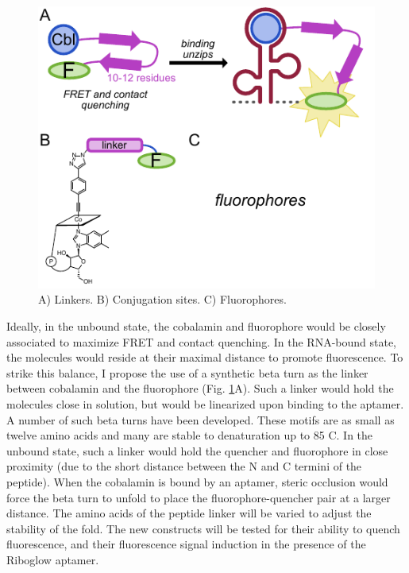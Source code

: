 \begin{figure}
\begin{centering}
\includegraphics[width=\textwidth]{figures/aim1v2.pdf}

\end{centering}
\footnotesize
\caption{\label{figure:aim1}
A) Linkers. B) Conjugation sites. C) Fluorophores.
}
\end{figure}

Ideally, in the unbound state, the cobalamin and fluorophore would be closely associated to maximize FRET and contact quenching.\cite{LeeDesignSynthesisCharacterization2009} In the RNA-bound state, the molecules would reside at their maximal distance to promote fluorescence. To strike this balance, I propose the use of a synthetic beta turn as the linker between cobalamin and the fluorophore (Fig. \ref{figure:aim1}A). Such a linker would hold the molecules close in solution, but would be linearized upon binding to the aptamer. A number of such beta turns have been developed. These motifs are as small as twelve amino acids and many are stable to denaturation up to 85 C.\cite{KierProbingLowerSize2008} In the unbound state, such a linker would hold the quencher and fluorophore in close proximity (due to the short distance between the N and C termini of the peptide). When the cobalamin is bound by an aptamer, steric occlusion would force the beta turn to unfold to place the fluorophore-quencher pair at a larger distance. The amino acids of the peptide linker will be varied to adjust the stability of the fold.  The new constructs will be tested for their ability to quench fluorescence, and their fluorescence signal induction in the presence of the Riboglow aptamer.

